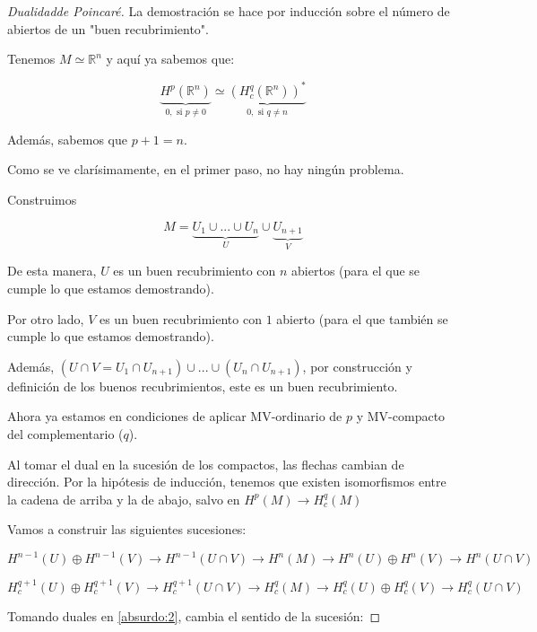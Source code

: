 \documentclass[palatino, bibnumbers]{apuntes}
\begin{document}
\begin{proof}[Dualidad\IS de Poincaré]

La demostración se hace por inducción sobre el número de abiertos de un "buen recubrimiento". 


Tenemos $M \simeq ℝ^n$ y aquí ya sabemos que:

\[
	\underbrace{H^p(ℝ^n)}_{0, \text{ si }p≠0} \simeq \underbrace{\left(H_c^q(ℝ^n)\right)^{\ast}}_{0,\text{ si } q≠n}
\]

Además, sabemos que $p+1 = n$.

Como se ve clarísimamente, en el primer paso, no hay ningún problema.



Construimos

\[
	M = \underbrace{U_1 \cup ... \cup U_n}_{U} \cup \underbrace{U_{n+1}}_{V}
\]

De esta manera, $U$ es un buen recubrimiento con $n$ abiertos (para el que se cumple lo que estamos demostrando).

Por otro lado, $V$ es un buen recubrimiento con $1$ abierto (para el que también se cumple lo que estamos demostrando).

Además, $(U\cap V = U_1\cap U_{n+1})\cup ... \cup (U_n\cap U_{n+1})$, por construcción y definición de los buenos recubrimientos, este es un buen recubrimiento. 

Ahora ya estamos en condiciones de aplicar MV-ordinario de $p$ y MV-compacto del complementario ($q$).

Al tomar el dual en la sucesión de los compactos, las flechas cambian de dirección. Por la hipótesis de inducción, tenemos que existen isomorfismos entre la cadena de arriba y la de abajo, salvo en $H^p(M) \to H^q_c(M)$

Vamos a construir las siguientes sucesiones:

\begin{equation*}
\label{absurdo:1}
H^{n-1}(U) \oplus H^{n-1}(V) \to H^{n-1}(U\cap V) \to H^n(M) \to H^{n}(U)\oplus H^n(V) \to H^n(U\cap V)
\end{equation*}

\begin{equation}
\label{absurdo:2}
H_c^{q+1}(U) \oplus H_c^{q+1}(V) \to H_c^{q+1}(U\cap V) \to H_c^q(M) \to H_c^{q}(U)\oplus H_c^q(V) \to H_c^q(U\cap V)
\end{equation}

Tomando duales en \ref{absurdo:2}, cambia el sentido de la sucesión: 


\end{proof}
\end{document}
